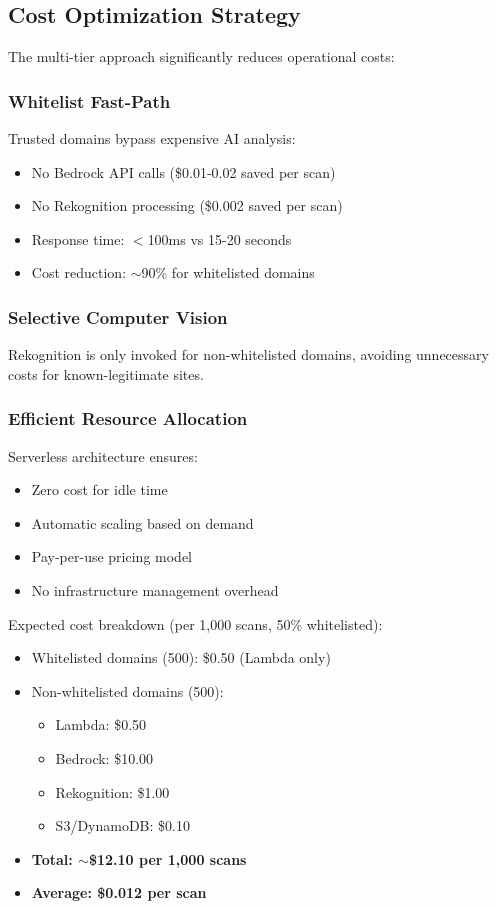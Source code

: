 \documentclass[conference]{IEEEtran}
\begin{document}
\subsection{Cost Optimization Strategy}

The multi-tier approach significantly reduces operational costs:

\subsubsection{Whitelist Fast-Path}

Trusted domains bypass expensive AI analysis:
\begin{itemize}
\item No Bedrock API calls (\$0.01-0.02 saved per scan)
\item No Rekognition processing (\$0.002 saved per scan)
\item Response time: $<$100ms vs 15-20 seconds
\item Cost reduction: $\sim$90\% for whitelisted domains
\end{itemize}

\subsubsection{Selective Computer Vision}

Rekognition is only invoked for non-whitelisted domains, avoiding unnecessary costs for known-legitimate sites.

\subsubsection{Efficient Resource Allocation}

Serverless architecture ensures:
\begin{itemize}
\item Zero cost for idle time
\item Automatic scaling based on demand
\item Pay-per-use pricing model
\item No infrastructure management overhead
\end{itemize}

Expected cost breakdown (per 1,000 scans, 50\% whitelisted):
\begin{itemize}
\item Whitelisted domains (500): \$0.50 (Lambda only)
\item Non-whitelisted domains (500):
  \begin{itemize}
  \item Lambda: \$0.50
  \item Bedrock: \$10.00
  \item Rekognition: \$1.00
  \item S3/DynamoDB: \$0.10
  \end{itemize}
\item \textbf{Total: $\sim$\$12.10 per 1,000 scans}
\item \textbf{Average: \$0.012 per scan}
\end{itemize}
\end{document}
